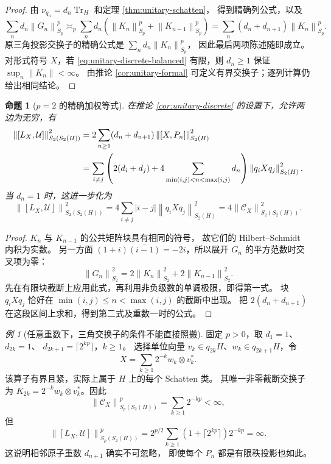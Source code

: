 \documentclass[UTF8,11pt,a4paper,fontset=fandol]{ctexart}
\newtheorem{proposition}[theorem]{命题}
\theoremstyle{remark}
\newtheorem{example}[theorem]{例}
\numberwithin{equation}{section}
\newcommand{\CC}{\mathcal C}
\newcommand{\Tr}{\operatorname{Tr}}
\newcommand{\norm}[1]{\left\lVert #1\right\rVert}
\begin{document}
\begin{proof}
由 $\nu_{q_n}=d_n\Tr_H$ 和定理 \ref{thm:unitary-schatten}，
得到精确列公式，以及
\[
 \sum_nd_n\norm{G_n}_{S_p}^p
 \asymp_p\sum_nd_n\left(\norm{K_n}_{S_p}^p+\norm{K_{n-1}}_{S_p}^p\right)
 =\sum_n(d_n+d_{n+1})\norm{K_n}_{S_p}^p.
\]
原三角投影交换子的精确公式是 $\sum_nd_n\norm{K_n}_{S_p}^p$，
因此最后两项陈述随即成立。
对形式符号 $X$，若 \eqref{eq:unitary-discrete-balanced} 有限，则
$d_n\geq1$ 保证 $\sup_n\norm{K_n}<\infty$。
由推论 \ref{cor:unitary-formal} 可定义有界交换子；逐列计算仍给出相同结论。
\end{proof}

\begin{proposition}[$p=2$ 的精确加权等式]\label{prop:unitary-hs}
在推论 \ref{cor:unitary-discrete} 的设置下，允许两边为无穷，有
\begin{align}
 \norm{[L_X,\mathcal U]}_{S_2(S_2(H))}^2
 &=2\sum_{n\geq1}(d_n+d_{n+1})\norm{[X,P_n]}_{S_2(H)}^2
       \label{eq:unitary-hs-exact}\\
 &=\sum_{i\ne j}\left(2(d_i+d_j)
       +4\sum_{\min(i,j)<n<\max(i,j)}d_n\right)
       \norm{q_iXq_j}_{S_2(H)}^2.\notag
\end{align}
当 $d_n=1$ 时，这进一步化为
\[
 \norm{[L_X,\mathcal U]}_{S_2(S_2(H))}^2
 =4\sum_{i\ne j}|i-j|\norm{q_iXq_j}_{S_2(H)}^2
 =4\norm{\CC_X}_{S_2(S_2(H))}^2.
\]
\end{proposition}

\begin{proof}
$K_n$ 与 $K_{n-1}$ 的公共矩阵块具有相同的符号，
故它们的 Hilbert--Schmidt 内积为实数。
另一方面 $(1+i)\overline{(i-1)}=-2i$，所以展开 $G_n$ 的平方范数时交叉项为零：
\[
 \norm{G_n}_{S_2}^2=2\norm{K_n}_{S_2}^2+2\norm{K_{n-1}}_{S_2}^2.
\]
先在有限块截断上应用此式，再利用非负级数的单调极限，即得第一式。
块 $q_iXq_j$ 恰好在 $\min(i,j)\leq n<\max(i,j)$ 的截断中出现。
把 $2(d_n+d_{n+1})$ 在这段区间上求和，得到第二式及重数一时的公式。
\end{proof}

\begin{example}[任意重数下，三角交换子的条件不能直接照搬]\label{ex:unitary-multiplicity}
固定 $p>0$，取 $d_1=1$、$d_{2k}=1$、
$d_{2k+1}=\lceil2^{kp}\rceil$，$k\geq1$。
选择单位向量 $v_k\in q_{2k}H$、$w_k\in q_{2k+1}H$，令
\[
 X=\sum_{k\geq1}2^{-k}w_k\otimes v_k^*.
\]
该算子有界且紧，实际上属于 $H$ 上的每个 Schatten 类。
其唯一非零截断交换子为
$K_{2k}=2^{-k}w_k\otimes v_k^*$。因此
\[
 \norm{\CC_X}_{S_p(S_2(H))}^p=\sum_{k\geq1}2^{-kp}<\infty,
\]
但
\[
 \norm{[L_X,\mathcal U]}_{S_p(S_2(H))}^p
 =2^{p/2}\sum_{k\geq1}(1+\lceil2^{kp}\rceil)2^{-kp}=\infty.
\]
这说明相邻原子重数 $d_{n+1}$ 确实不可忽略，
即使每个 $P_n$ 都是有限秩投影也如此。
\end{example}
\end{document}

